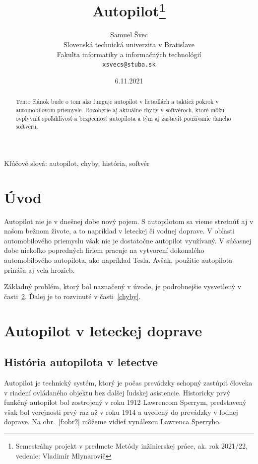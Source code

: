 \documentclass[10pt,twoside,slovak,a4paper]{article}
\title{Autopilot\thanks{Semestrálny projekt v predmete Metódy inžinierskej práce, ak. rok 2021/22, vedenie: Vladimír Mlynarovič}} %
\author{Samuel Švec\\[2pt]
	{\small Slovenská technická univerzita v Bratislave}\\
	{\small Fakulta informatiky a informačných technológií}\\
	{\small \texttt{xsvecs@stuba.sk}}
	}
\date{\small 6.11.2021} %
\begin{document}
\maketitle

\begin{abstract}
Tento článok bude o tom ako funguje autopilot v lietadlách a taktiež pokrok v automobilovom priemysle. Rozoberie aj aktuálne chyby v softvéroch, ktoré môžu ovplyvniť spoľahlivosť a bezpečnosť autopilota a tým aj zastaviť používanie daného softvéru.
\end{abstract}

Kľúčové slová: autopilot, chyby, história, softvér

\section{Úvod}

Autopilot nie je v dnešnej dobe nový pojem. S autopilotom sa vieme stretnúť aj v našom bežnom živote, a to napríklad v leteckej či vodnej doprave. V oblasti automobilového priemyslu však nie je dostatočne autopilot využívaný. V súčasnej dobe niekoľko popredných firiem pracuje na vytvorení dokonalého automobilového autopilota, ako napríklad Tesla. Avšak, použitie autopilota prináša aj veľa hrozieb. 

Základný problém, ktorý bol naznačený v úvode, je podrobnejšie vysvetlený v časti~\ref{AFA}.
Ďalej je to rozvinuté v časti~\ref{chyby}.


\section{Autopilot v leteckej doprave} \label{AFA}

\subsection{História autopilota v letectve} 

Autopilot je technický systém, ktorý je počas prevádzky schopný zastúpiť človeka v riadení ovládaného objektu bez ďalšej ľudskej asistencie. Historicky prvý funkčný autopilot bol zostrojený v roku 1912 Lawrencom Sperrym, predstavený však bol verejnosti prvý raz až v roku 1914 a uvedený do prevádzky v lodnej doprave.\cite{AVA} Na obr.~\ref{f:obr2} môžeme vidieť vynálezcu Lawrenca Sperryho.
\end{document}
